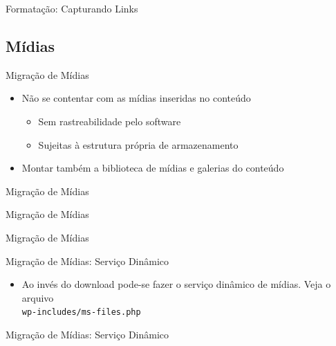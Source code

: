 \documentclass[handout]{beamer}
\begin{document}
\begin{frame}{Formatação: Capturando Links}
  
\end{frame}


\subsection{Mídias}

\begin{frame}{Migração de Mídias}
  \begin{itemize}
    \pause \item Não se contentar com as mídias inseridas no conteúdo
    \begin{itemize}
      \pause \item Sem rastreabilidade pelo software
      \pause \item Sujeitas à estrutura própria de armazenamento
    \end{itemize}
    \pause \item Montar também a biblioteca de mídias e galerias do conteúdo
  \end{itemize}
\end{frame}

\begin{frame}{Migração de Mídias}
  
\end{frame}

\begin{frame}{Migração de Mídias}
  
\end{frame}

\begin{frame}{Migração de Mídias}
  
\end{frame}

\begin{frame}{Migração de Mídias: Serviço Dinâmico}
  \begin{itemize}
    \item Ao invés do download pode-se fazer o serviço dinâmico de mídias.
          Veja o arquivo \\
          \texttt{wp-includes/ms-files.php}
  \end{itemize}
\end{frame}

\begin{frame}{Migração de Mídias: Serviço Dinâmico}
  
\end{frame}
\end{document}
